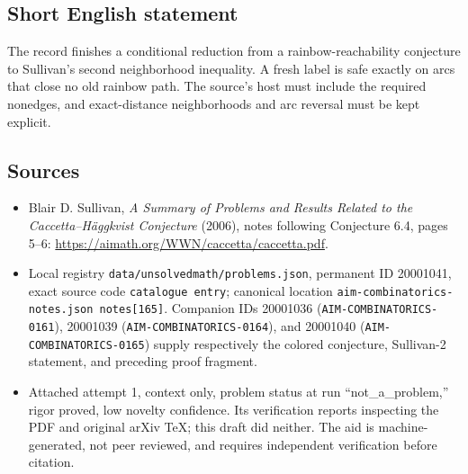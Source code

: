 \documentclass[11pt]{article}
\begin{document}
\subsection{Short English statement}
The record finishes a conditional reduction from a rainbow-reachability conjecture to Sullivan's second neighborhood inequality. A fresh label is safe exactly on arcs that close no old rainbow path. The source's host must include the required nonedges, and exact-distance neighborhoods and arc reversal must be kept explicit.
\subsection{Sources}
\begin{itemize}
\item Blair D. Sullivan, \emph{A Summary of Problems and Results Related to the Caccetta--H\"aggkvist Conjecture} (2006), notes following Conjecture 6.4, pages 5--6: \url{https://aimath.org/WWN/caccetta/caccetta.pdf}.
\item Local registry \texttt{data/unsolvedmath/problems.json}, permanent ID 20001041, exact source code \texttt{catalogue entry}; canonical location \texttt{aim-combinatorics-notes.json notes[165]}. Companion IDs 20001036 (\texttt{AIM-COMBINATORICS-0161}), 20001039 (\texttt{AIM-COMBINATORICS-0164}), and 20001040 (\texttt{AIM-COMBINATORICS-0165}) supply respectively the colored conjecture, Sullivan-2 statement, and preceding proof fragment.
\item Attached attempt 1, context only, problem status at run ``not\_a\_problem,'' rigor proved, low novelty confidence. Its verification reports inspecting the PDF and original arXiv TeX; this draft did neither. The aid is machine-generated, not peer reviewed, and requires independent verification before citation.
\end{itemize}
\end{document}
